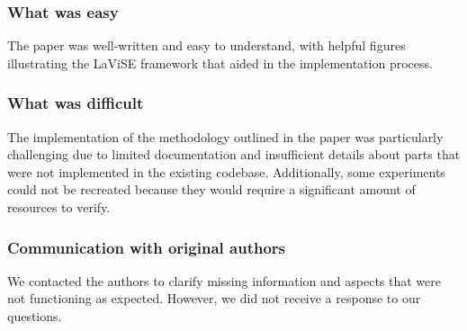 \subsubsection*{What was easy}
The paper was well-written and easy to understand, with helpful figures illustrating the LaViSE framework that aided in the implementation process.

\subsubsection*{What was difficult}
The implementation of the methodology outlined in the paper was particularly challenging due to limited documentation and insufficient details about parts that were not implemented in the existing codebase. Additionally, some experiments could not be recreated because they would require a significant amount of resources to verify.

\subsubsection*{Communication with original authors}
We contacted the authors to clarify missing information and aspects that were not functioning as expected. However, we did not receive a response to our questions.
